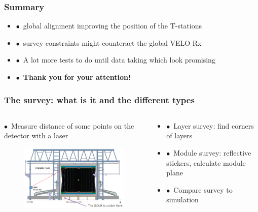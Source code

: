 \documentclass[aspectratio=1610, 12pt, xcolor=dvipsnames]{beamer}
\begin{document}
\begin{frame}\frametitle{Summary}
  \begin{itemize}
    \setlength\itemsep{0em}
    \item $\bullet$\, global alignment improving the position of the T-stations
    \item $\bullet$\, survey constraints might counteract the global VELO Rx
    \item $\bullet$\, A lot more tests to do until data taking which look promising
    \item $\bullet$\, \textbf{Thank you for your attention!}
  \end{itemize}
\end{frame}

%   

\begin{frame}\frametitle{The survey: what is it and the different types}
  \begin{columns}
    \begin{column}[c]{0.48\textwidth}
      $\bullet$\, Measure distance of some points on the detector with a laser
      \begin{figure}
        \centering
        \includegraphics[width=\textwidth]{logos/survey.png}
      \end{figure}
    \end{column}
    \begin{column}[c]{0.48\textwidth}
      \begin{itemize}
        \item $\bullet$\, Layer survey: find corners of layers
        \item $\bullet$\, Module survey: reflective stickers, calculate module plane
        \item $\bullet$\, Compare survey to simulation
      \end{itemize}
    \end{column}
  \end{columns}
\end{frame}
\end{document}

